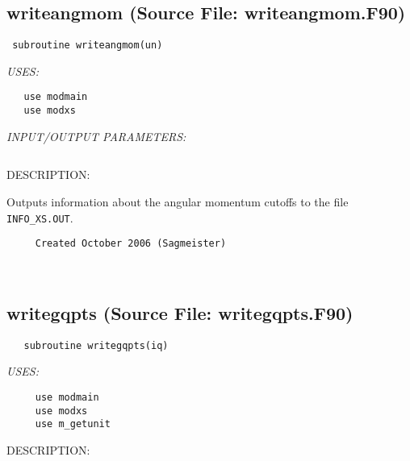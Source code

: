 \documentclass[11pt]{article}
\begin{document}
\subsection{writeangmom (Source File: writeangmom.F90)}


\begin{verbatim} subroutine writeangmom(un)\end{verbatim}{\em USES:}
\begin{verbatim}   use modmain
   use modxs\end{verbatim}{\em INPUT/OUTPUT PARAMETERS:}
\begin{verbatim} \end{verbatim}
{\sf DESCRIPTION:\\ }

    Outputs information about the angular momentum cutoffs to the file
     {\tt INFO\_XS.OUT}.
  
\begin{verbatim}     Created October 2006 (Sagmeister)\end{verbatim}










 
 
\mbox{}\hrulefill\ 
 
\subsection{writegqpts (Source File: writegqpts.F90)}


\begin{verbatim}   subroutine writegqpts(iq)\end{verbatim}{\em USES:}
\begin{verbatim}     use modmain
     use modxs
     use m_getunit\end{verbatim}
{\sf DESCRIPTION:\\ }
\end{document}
